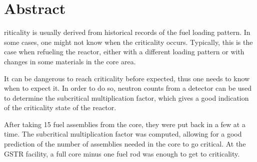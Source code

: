 %
%
%

\chapter*{Abstract}
\begin{SingleSpace}
riticality is usually derived from historical records of the fuel loading pattern. In some cases, one might not know when the criticality occurs. Typically, this is the case when refueling the reactor, either with a different loading pattern or with changes in some materials in the core area.

It can be dangerous to reach criticality before expected, thus one needs to know when to expect it. In order to do so, neutron counts from a detector can be used to determine the subcritical multiplication factor, which gives a good indication of the criticality state of the reactor.

After taking 15 fuel assemblies from the core, they were put back in a few at a time. The subcritical multiplication factor was computed, allowing for a good prediction of the number of assemblies needed in the core to go critical. At the GSTR facility, a full core minus one fuel rod was enough to get to criticality.
\end{SingleSpace}
\clearpage
